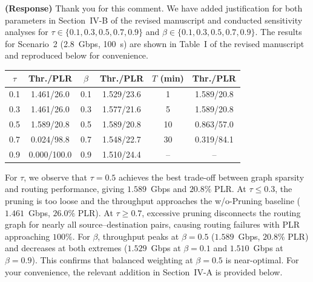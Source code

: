 \documentclass[letter]{article}
\begin{document}
\vspace{10mm}
\noindent {}

\vspace{5mm}
{\bf (Response)}
Thank you for this comment. We have added justification for both parameters in Section~IV-B of the revised manuscript and conducted sensitivity analyses for $\tau \in \{0.1, 0.3, 0.5, 0.7, 0.9\}$ and $\beta \in \{0.1, 0.3, 0.5, 0.7, 0.9\}$. The results for Scenario~2 (2.8~Gbps, 100~s) are shown in Table~I of the revised manuscript and reproduced below for convenience.

\begin{center}
\color{blue}
\setlength{\tabcolsep}{3.5pt}
\begin{tabular}{cc|cc|cc}
\hline
$\tau$ & Thr./PLR & $\beta$ & Thr./PLR & $T$ (min) & Thr./PLR \\
\hline
0.1 & 1.461/26.0  & 0.1 & 1.529/23.6 & 1  & 1.589/20.8 \\
0.3 & 1.461/26.0  & 0.3 & 1.577/21.6 & 5  & 1.589/20.8 \\
0.5 & 1.589/20.8  & 0.5 & 1.589/20.8 & 10 & 0.863/57.0 \\
0.7 & 0.024/98.8  & 0.7 & 1.548/22.7 & 30 & 0.319/84.1 \\
0.9 & 0.000/100.0 & 0.9 & 1.510/24.4 & -- & --         \\
\hline
\end{tabular}
\end{center}

For $\tau$, we observe that $\tau = 0.5$ achieves the best trade-off between graph sparsity and routing performance, giving $1.589$~Gbps and $20.8\%$ PLR. At $\tau \leq 0.3$, the pruning is too loose and the throughput approaches the w/o-Pruning baseline ($1.461$~Gbps, $26.0\%$ PLR). At $\tau \geq 0.7$, excessive pruning disconnects the routing graph for nearly all source--destination pairs, causing routing failures with PLR approaching $100\%$. For $\beta$, throughput peaks at $\beta = 0.5$ ($1.589$~Gbps, $20.8\%$ PLR) and decreases at both extremes ($1.529$~Gbps at $\beta = 0.1$ and $1.510$~Gbps at $\beta = 0.9$). This confirms that balanced weighting at $\beta = 0.5$ is near-optimal. For your convenience, the relevant addition in Section~IV-A is provided below.
\end{document}
